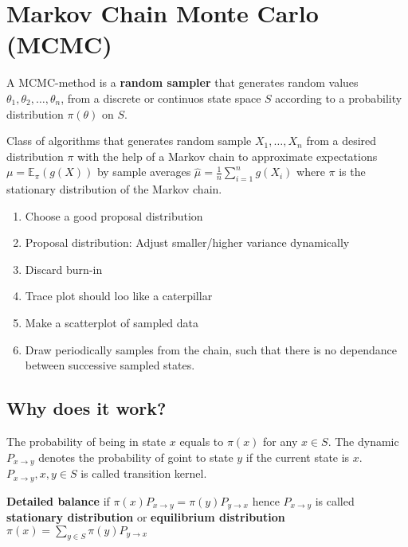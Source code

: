 \section{Markov Chain Monte Carlo (MCMC)}
A MCMC-method is a \textbf{random sampler} that generates random values
$\theta_1,\theta_2,\ldots,\theta_n$,
from a discrete or continuos state space $S$ according to a probability
distribution $\pi(\theta)$ on $S$.

Class of algorithms that generates random sample $X_1,\ldots,X_n$ from a
desired distribution $\pi$ with the help of a Markov chain to approximate
expectations $\mu = \mathbb{E}_\pi(g(X))$ by sample averages
$\widehat\mu = \frac{1}{n} \sum_{i=1}^n g(X_i)$ where $\pi$ is the stationary
distribution of the Markov chain.

\begin{enumerate}
\item Choose a good proposal distribution
\item Proposal distribution: Adjust smaller/higher variance dynamically
\item Discard burn-in
\item Trace plot should loo like a caterpillar
\item Make a scatterplot of sampled data
\item Draw periodically samples from the chain,
such that there is no dependance between successive sampled states.
\end{enumerate}

\subsection{Why does it work?}
The probability of being in state $x$ equals to $\pi(x)$ for any $x \in S$.
The dynamic $P_{x \rightarrow y}$ denotes the probability of goint to state $y$
if the current state is $x$.
$P_{x \rightarrow y}, x, y \in S$ is called transition kernel.

\textbf{Detailed balance} if
$\pi(x) P_{x \rightarrow y} = \pi(y) P_{y \rightarrow x}$
hence $P_{x \rightarrow y}$ is called \textbf{stationary distribution} or
\textbf{equilibrium distribution}
$\pi(x) = \sum_{y \in S} \pi(y) P_{y \rightarrow x}$

